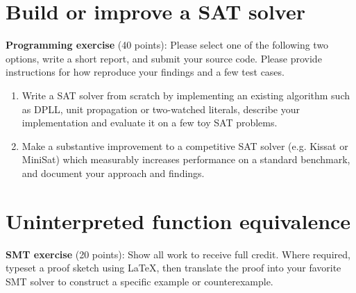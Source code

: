 \documentclass[11pt]{article}
\begin{document}
    \pagebreak


    \section{Build or improve a SAT solver}

    \noindent \textbf{Programming exercise} (40 points): Please select one of the following two options, write a short report, and submit your source code. Please provide instructions for how reproduce your findings and a few test cases.

    \begin{enumerate}
        \item Write a SAT solver from scratch by implementing an existing algorithm such as DPLL, unit propagation or two-watched literals, describe your implementation and evaluate it on a few toy SAT problems.
        \item Make a substantive improvement to a competitive SAT solver (e.g. Kissat or MiniSat) which measurably increases performance on a standard benchmark, and document your approach and findings.
    \end{enumerate}

    \section {Uninterpreted function equivalence}

    \noindent \textbf{SMT exercise} (20 points): Show all work to receive full credit. Where required, typeset a proof sketch using \LaTeX, then translate the proof into your favorite SMT solver to construct a specific example or counterexample.
\end{document}
